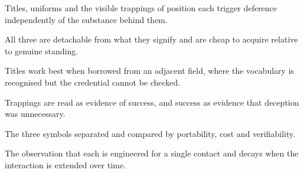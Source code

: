 

\begin{distilled}
  \item Titles, uniforms and the visible trappings of position each trigger deference independently of the substance behind them.
  \item All three are detachable from what they signify and are cheap to acquire relative to genuine standing.
  \item Titles work best when borrowed from an adjacent field, where the vocabulary is recognised but the credential cannot be checked.
  \item Trappings are read as evidence of success, and success as evidence that deception was unnecessary.
\end{distilled}

\begin{unique}
  \item The three symbols separated and compared by portability, cost and verifiability.
  \item The observation that each is engineered for a single contact and decays when the interaction is extended over time.
\end{unique}
